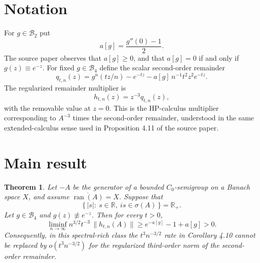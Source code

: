 \documentclass[11pt]{article}
\newtheorem{theorem}{Theorem}
\DeclareMathOperator{\ran}{ran}
\newcommand{\R}{\mathbb R}
\newcommand{\cB}{\mathcal B}
\begin{document}
\section*{Notation}

For \(g\in\cB_2\) put
\[
  a[g]=\frac{g''(0)-1}{2}.
\]
The source paper observes that \(a[g]\geq 0\), and that \(a[g]=0\) if and only
if \(g(z)\equiv e^{-z}\).  For fixed \(g\in\cB_4\) define the scalar
second-order remainder
\[
  q_{t,n}(z)=g^n(tz/n)-e^{-tz}-a[g]\,n^{-1}t^2z^2e^{-tz}.
\]
The regularized remainder multiplier is
\[
  h_{t,n}(z)=z^{-3}q_{t,n}(z),
\]
with the removable value at \(z=0\).  This is the HP-calculus multiplier
corresponding to \(A^{-3}\) times the second-order remainder, understood in
the same extended-calculus sense used in Proposition 4.11 of the source paper.

\section*{Main result}

\begin{theorem}
Let \(-A\) be the generator of a bounded \(C_0\)-semigroup on a Banach space
\(X\), and assume \(\overline{\ran(A)}=X\).  Suppose that
\[
  \{\,|s|:\ s\in\R,\ is\in\sigma(A)\,\}=\R_+ .
\]
Let \(g\in\cB_4\) and \(g(z)\not\equiv e^{-z}\).  Then for every \(t>0\),
\[
 \liminf_{n\to\infty} n^{3/2}t^{-3}\,\|h_{t,n}(A)\|
 \geq e^{-a[g]}-1+a[g] >0 .
\]
Consequently, in this spectral-rich class the \(t^3n^{-3/2}\) rate in
Corollary 4.10 cannot be replaced by \(o(t^3n^{-3/2})\) for the regularized
third-order norm of the second-order remainder.
\end{theorem}
\end{document}

